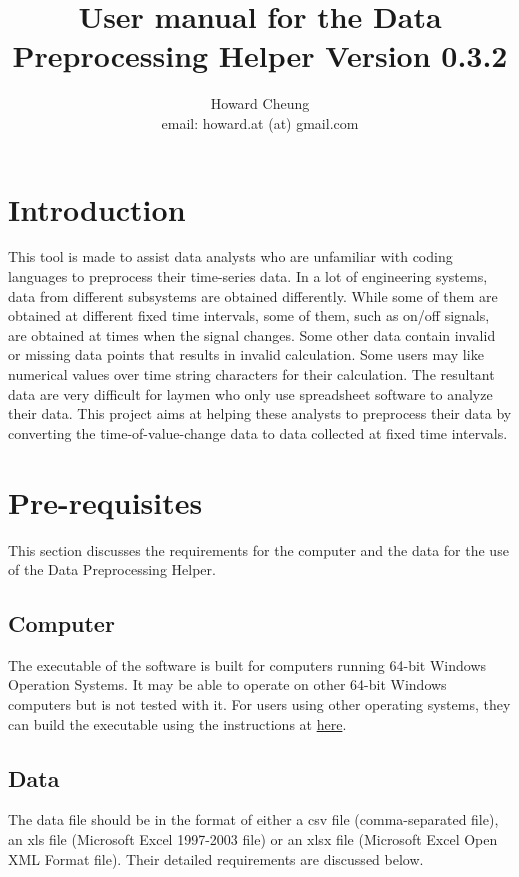 \documentclass[12pt,a4paper]{article}
\author{Howard Cheung \\ email: howard.at (at) gmail.com }
\title{User manual for the Data Preprocessing Helper Version 0.3.2}
\begin{document}
\maketitle

\tableofcontents

\section{Introduction}

This tool is made to assist data analysts who are unfamiliar with coding languages to preprocess their time-series data.
In a lot of engineering systems, data from different subsystems are obtained differently.
While some of them are obtained at different fixed time intervals, some of them, such as on/off signals, are obtained at times when the signal changes.
Some other data contain invalid or missing data points that results in invalid calculation.
Some users may like numerical values over time string characters for their calculation.
The resultant data are very difficult for laymen who only use spreadsheet software to analyze their data.
This project aims at helping these analysts to preprocess their data by converting the time-of-value-change data to data collected at fixed time intervals.

\section{Pre-requisites}
This section discusses the requirements for the computer and the data for the use of the Data Preprocessing Helper.

\subsection{Computer}
The executable of the software is built for computers running 64-bit Windows Operation Systems.
It may be able to operate on other 64-bit Windows computers but is not tested with it.
For users using other operating systems, they can build the executable using the instructions at \href{https://github.com/howardcheung/data-preprocessing-helper/blob/master/exe/README.md}{here}.

\subsection{Data}
The data file should be in the format of either a csv file (comma-separated file), an xls file (Microsoft Excel 1997-2003 file) or an xlsx file (Microsoft Excel Open XML Format file). Their detailed requirements are discussed below.
\end{document}
